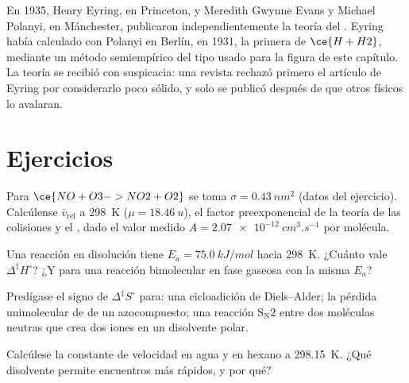 \begin{history}
En 1935, Henry Eyring, en Princeton, y Meredith Gwynne Evans y Michael
Polanyi, en Mánchester, publicaron independientemente la teoría del . Eyring había calculado con Polanyi en Berlín, en 1931, la primera
 de $\ce{H + H2}$, mediante un método semiempírico del tipo usado
para la figura de este capítulo. La teoría se recibió con suspicacia: una
revista rechazó primero el artículo de Eyring por considerarlo poco sólido, y solo se publicó
después de que otros físicos lo avalaran.
\end{history}

\section{Ejercicios}

\begin{exercise}[$\star$]\label{exo:b3:rate-theories:1}
Para $\ce{NO + O3 -> NO2 + O2}$ se toma $\sigma = \qty{0.43}{nm^2}$ (datos del ejercicio). Calcúlense $\bar v_{\mathrm{rel}}$
a \qty{298}{K} ($\mu = \qty{18.46}{u}$), el factor preexponencial de la teoría de las colisiones y el
, dado el valor medido $A = \qty{2.07e-12}{cm^3.s^{-1}}$ por molécula.
\end{exercise}

\begin{exercise}[$\star$]\label{exo:b3:rate-theories:2}
Una reacción en disolución tiene $E_a = \qty{75.0}{kJ/mol}$ hacia \qty{298}{K}. ¿Cuánto vale $\Delta^{\ddagger}H^\circ$? ¿Y
para una reacción bimolecular en fase gaseosa con la misma $E_a$?
\end{exercise}

\begin{exercise}[$\star$]\label{exo:b3:rate-theories:3}
Predígase el signo de $\Delta^{\ddagger}S^\circ$ para: una cicloadición de Diels--Alder; la
pérdida unimolecular de  de un azocompuesto; una reacción $\mathrm{S_N2}$ entre dos
moléculas neutras que crea dos iones en un disolvente polar.
\end{exercise}

\begin{exercise}[$\star$]\label{exo:b3:rate-theories:4}
Calcúlese la constante de velocidad  en agua y en hexano a
\qty{298.15}{K}. ¿Qué disolvente permite encuentros más rápidos, y por qué?
\end{exercise}

